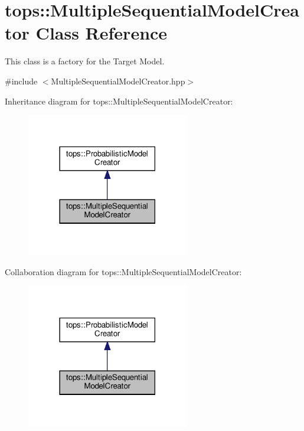 \hypertarget{classtops_1_1MultipleSequentialModelCreator}{}\section{tops\+:\+:Multiple\+Sequential\+Model\+Creator Class Reference}
\label{classtops_1_1MultipleSequentialModelCreator}


This class is a factory for the Target Model.  




{\ttfamily \#include $<$Multiple\+Sequential\+Model\+Creator.\+hpp$>$}



Inheritance diagram for tops\+:\+:Multiple\+Sequential\+Model\+Creator\+:
\nopagebreak
\begin{figure}[H]
\begin{center}
\leavevmode
\includegraphics[width=201pt]{classtops_1_1MultipleSequentialModelCreator__inherit__graph}
\end{center}
\end{figure}


Collaboration diagram for tops\+:\+:Multiple\+Sequential\+Model\+Creator\+:
\nopagebreak
\begin{figure}[H]
\begin{center}
\leavevmode
\includegraphics[width=201pt]{classtops_1_1MultipleSequentialModelCreator__coll__graph}
\end{center}
\end{figure}
